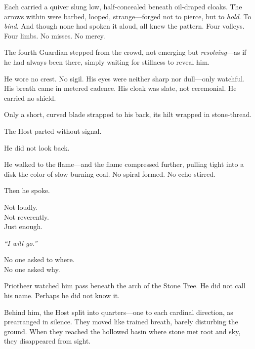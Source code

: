 \documentclass[12pt]{article}
\begin{document}
\vspace{0.5em}
Each carried a quiver slung low, half-concealed beneath oil-draped cloaks. The arrows within were barbed, looped, strange---forged not to pierce, but to \textit{hold}. To \textit{bind}. And though none had spoken it aloud, all knew the pattern. Four volleys. Four limbs. No misses. No mercy.

\vspace{0.5em}
The fourth Guardian stepped from the crowd, not emerging but \textit{resolving}---as if he had always been there, simply waiting for stillness to reveal him.

\vspace{0.5em}
He wore no crest. No sigil. His eyes were neither sharp nor dull---only watchful. His breath came in metered cadence. His cloak was slate, not ceremonial. He carried no shield.

\vspace{0.5em}
Only a short, curved blade strapped to his back, its hilt wrapped in stone-thread.

\vspace{0.5em}
The Host parted without signal.

\vspace{0.5em}
He did not look back.

\vspace{0.5em}
He walked to the flame---and the flame compressed further, pulling tight into a disk the color of slow-burning coal. No spiral formed. No echo stirred.

\vspace{0.5em}
Then he spoke.

\vspace{0.5em}
Not loudly.\\
Not reverently.\\
Just enough.

\vspace{0.5em}
\textit{``I will go.''}

\vspace{0.5em}
No one asked to where.\\
No one asked why.

\vspace{0.5em}
Priotheer watched him pass beneath the arch of the Stone Tree. He did not call his name. Perhaps he did not know it.

\vspace{0.5em}
Behind him, the Host split into quarters---one to each cardinal direction, as prearranged in silence. They moved like trained breath, barely disturbing the ground. When they reached the hollowed basin where stone met root and sky, they disappeared from sight.
\end{document}
